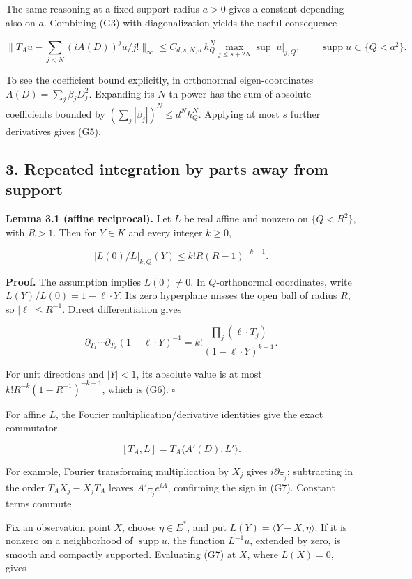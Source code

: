 \documentclass[
  11pt,
]{article}
\begin{document}
The same reasoning at a fixed support radius \(a>0\) gives a constant
depending also on \(a\). Combining (G3) with diagonalization yields the
useful consequence

\[
\|T_Au-\sum_{j<N}(iA(D))^ju/j!\|_\infty
\leq C_{d,s,N,a}\,h_Q^N
\max_{j\leq s+2N}\sup|u|_{j,Q},\qquad
\operatorname{supp}u\subset\{Q<a^2\}.                         \tag{G5}
\]

To see the coefficient bound explicitly, in orthonormal
eigen-coordinates \(A(D)=\sum_j\beta_jD_j^2\). Expanding its \(N\)-th
power has the sum of absolute coefficients bounded by
\((\sum_j|\beta_j|)^N\leq d^Nh_Q^N\). Applying at most \(s\) further
derivatives gives (G5).

\subsection{3. Repeated integration by parts away from
support}\label{repeated-integration-by-parts-away-from-support}

\textbf{Lemma 3.1 (affine reciprocal).} Let \(L\) be real affine and
nonzero on \(\{Q<R^2\}\), with \(R>1\). Then for \(Y\in K\) and every
integer \(k\geq0\),

\[
|L(0)/L|_{k,Q}(Y)\leq k!R(R-1)^{-k-1}.                      \tag{G6}
\]

\textbf{Proof.} The assumption implies \(L(0)\ne0\). In
\(Q\)-orthonormal coordinates, write \(L(Y)/L(0)=1-\ell\cdot Y\). Its
zero hyperplane misses the open ball of radius \(R\), so
\(|\ell|\leq R^{-1}\). Direct differentiation gives

\[
\partial_{T_1}\cdots\partial_{T_k}(1-\ell\cdot Y)^{-1}
=k!\frac{\prod_j(\ell\cdot T_j)}{(1-\ell\cdot Y)^{k+1}}.
\]

For unit directions and \(|Y|<1\), its absolute value is at most
\(k!R^{-k}(1-R^{-1})^{-k-1}\), which is (G6). \(\square\)

For affine \(L\), the Fourier multiplication/derivative identities give
the exact commutator

\[
[T_A,L]=T_A\langle A'(D),L'\rangle.                           \tag{G7}
\]

For example, Fourier transforming multiplication by \(X_j\) gives
\(i\partial_{\Xi_j}\); subtracting in the order \(T_AX_j-X_jT_A\) leaves
\(A'_{\Xi_j}e^{iA}\), confirming the sign in (G7). Constant terms
commute.

Fix an observation point \(X\), choose \(\eta\in E^*\), and put
\(L(Y)=\langle Y-X,\eta\rangle\). If it is nonzero on a neighborhood of
\(\operatorname{supp}u\), the function \(L^{-1}u\), extended by zero, is
smooth and compactly supported. Evaluating (G7) at \(X\), where
\(L(X)=0\), gives
\end{document}
